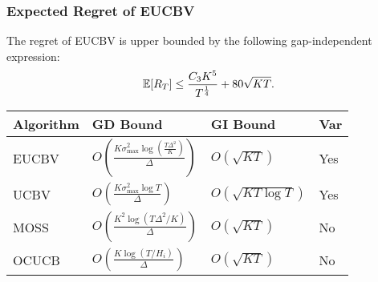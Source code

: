 \begin{frame}
\frametitle{Expected Regret of EUCBV}
%
%
%

\begin{corollary}
\label{Result:Corollary:1}
The regret of EUCBV is upper bounded by the following gap-independent expression:
\begin{align*}
	\mathbb{E}[R_{T}]\leq  \frac{C_3 K^5}{T^{\frac{1}{4}}} + 80\sqrt{KT}.
\end{align*}	
\end{corollary}


\begin{table}[b]
\label{tab:comp-bds}
\begin{center}
\begin{tabular}{|p{1.5cm}|p{3.1cm}|p{3.1cm}|p{1.0cm}|}
\hline
Algorithm  & GD Bound & GI Bound & Var \\
\hline
EUCBV      &$O\left( \frac{K\sigma_{\max}^{2}\log (\frac{T\Delta^2}{K})}{\Delta}\right)$ & $O\left(\sqrt{KT}\right)$ & Yes\\
\hline
UCBV		&$O\left( \frac{K\sigma_{\max}^{2}\log T}{\Delta} \right)$ & $O\left(\sqrt{KT\log T}\right)$ & Yes\\
\hline
MOSS         &$O\left( \frac{K^2\log (T\Delta^2 /K)}{\Delta}\right)$ & $O\left(\sqrt{KT}\right)$ & No\\
\hline
OCUCB		&$O\left( \frac{K\log (T/ H_{i})}{\Delta}\right)$ &  $O\left(\sqrt{KT}\right)$ & No\\
\hline

\end{tabular}
\end{center}
\end{table}



\end{frame}

